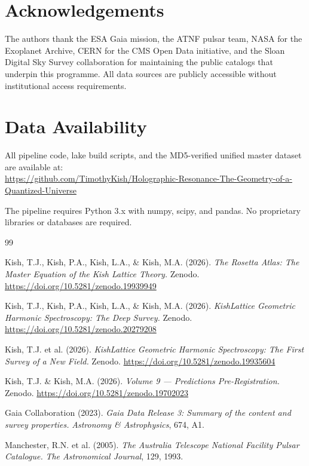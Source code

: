 \documentclass[12pt,a4paper]{article}
\begin{document}
\section*{Acknowledgements}

The authors thank the ESA Gaia mission, the ATNF pulsar team, NASA for the
Exoplanet Archive, CERN for the CMS Open Data initiative, and the Sloan
Digital Sky Survey collaboration for maintaining the public catalogs that
underpin this programme. All data sources are publicly accessible without
institutional access requirements.

\section*{Data Availability}

All pipeline code, lake build scripts, and the MD5-verified unified master
dataset are available at:\\
\url{https://github.com/TimothyKish/Holographic-Resonance-The-Geometry-of-a-Quantized-Universe}

The pipeline requires Python 3.x with numpy, scipy, and pandas. No proprietary
libraries or databases are required.

\begin{thebibliography}{99}

Kish, T.J., Kish, P.A., Kish, L.A., \& Kish, M.A. (2026).
\textit{The Rosetta Atlas: The Master Equation of the Kish Lattice Theory.}
Zenodo. \url{https://doi.org/10.5281/zenodo.19939949}

Kish, T.J., Kish, P.A., Kish, L.A., \& Kish, M.A. (2026).
\textit{KishLattice Geometric Harmonic Spectroscopy: The Deep Survey.}
Zenodo. \url{https://doi.org/10.5281/zenodo.20279208}

Kish, T.J. et al. (2026).
\textit{KishLattice Geometric Harmonic Spectroscopy: The First Survey of a New Field.}
Zenodo. \url{https://doi.org/10.5281/zenodo.19935604}

Kish, T.J. \& Kish, M.A. (2026).
\textit{Volume 9 --- Predictions Pre-Registration.}
Zenodo. \url{https://doi.org/10.5281/zenodo.19702023}

Gaia Collaboration (2023).
\textit{Gaia Data Release 3: Summary of the content and survey properties.}
\textit{Astronomy \& Astrophysics}, 674, A1.

Manchester, R.N. et al. (2005).
\textit{The Australia Telescope National Facility Pulsar Catalogue.}
\textit{The Astronomical Journal}, 129, 1993.

\end{thebibliography}
\end{document}
